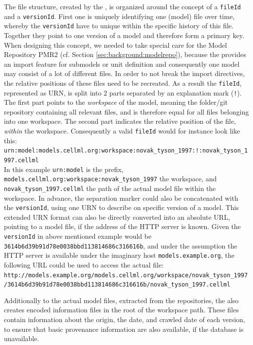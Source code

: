 The file structure, created by the \modelcrawler, is organized around the concept of a \texttt{fileId} and a \texttt{versionId}. First one is uniquely identifying one (model) file over time, whereby the \texttt{versionId} have to unique within the specific history of this file. Together they point to one version of a model and therefore form a primary key.
When designing this concept, we needed to take special care for the \cellml Model Repository PMR2 (cf. Section \ref{sec:background:modelrepo}), because the \cellml provides an import feature for submodels or unit definition and consequently one model may consist of a lot of different files. In order to not break the import directives, the relative positions of these files need to be recreated. As a result the \texttt{fileId}, represented as URN, is split into 2 parts separated by an explanation mark (\texttt{!}). The first part points to the \emph{workspace} of the model, meaning the folder/git repository containing all relevant files, and is therefore equal for all files belonging into one workspace. The second part indicates the relative position of the file, \emph{within} the workspace.
Consequently a valid \texttt{fileId} would for instance look like this:\\ \texttt{urn:model:models.cellml.org:workspace:novak\_tyson\_1997:!:novak\_tyson\_1997.cellml}\\
In this example \texttt{urn:model} is the prefix, \texttt{models.cellml.org:workspace:novak\_tyson\_1997} the workspace, and \texttt{novak\_tyson\_1997.cellml} the path of the actual model file within the workspace. In advance, the separation marker could also be concatenated with the \texttt{versionId}, using one URN to describe on specific version of a model. This extended URN format can also be directly converted into an absolute URL, pointing to a model file, if the address of the HTTP server is known.
Given the \texttt{versionId} in above mentioned example would be \texttt{3614b6d39b91d78e0038bbd113814686c316616b}, and under the assumption the HTTP server is available under the imaginary host \texttt{models.example.org}, the following URL could be used to access the actual file:\\
\texttt{http://models.example.org/models.cellml.org/workspace/novak\_tyson\_1997/3614b6d39b91d78e0038bbd113814686c316616b/novak\_tyson\_1997.cellml}

Additionally to the actual model files, extracted from the repositories, the \modelcrawler also creates \json encoded information files in the root of the workspace path. These files contain information about the origin, the date, and crawled date of each version, to ensure that basic provenance information are also available, if the \masymos database is unavailable.

